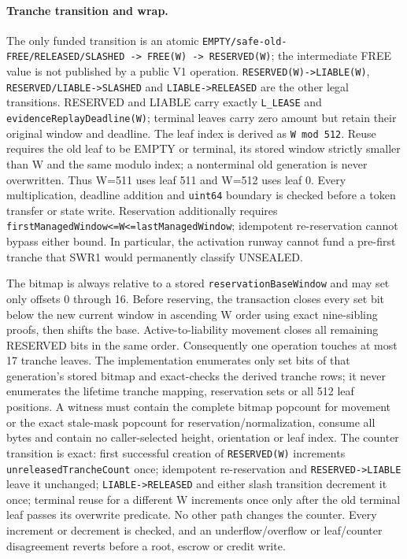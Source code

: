 \documentclass[a4paper,11pt]{article}
\newcommand{\code}[1]{\nolinkurl{#1}}
\begin{document}
\paragraph{Tranche transition and wrap.}
The only funded transition is an atomic
\code{EMPTY/safe-old-FREE/RELEASED/SLASHED -> FREE(W) -> RESERVED(W)};
the intermediate FREE value is not published by a public V1 operation.
\code{RESERVED(W)->LIABLE(W)},
\code{RESERVED/LIABLE->SLASHED} and \code{LIABLE->RELEASED} are the other
legal transitions.  RESERVED and LIABLE carry exactly \code{L_LEASE} and
\code{evidenceReplayDeadline(W)}; terminal leaves carry zero amount but retain
their original window and deadline.  The leaf index is derived as
\code{W mod 512}.  Reuse requires the old leaf to be EMPTY or terminal, its
stored window strictly smaller than W and the same modulo index; a nonterminal
old generation is never overwritten.  Thus W=511 uses leaf 511 and W=512 uses
leaf 0.  Every multiplication, deadline addition and \code{uint64} boundary is
checked before a token transfer or state write.  Reservation additionally
requires \code{firstManagedWindow<=W<=lastManagedWindow}; idempotent
re-reservation cannot bypass either bound.  In particular, the activation
runway cannot fund a pre-first tranche that SWR1 would permanently classify
UNSEALED.

The bitmap is always relative to a stored \code{reservationBaseWindow} and may
set only offsets 0 through 16.  Before reserving, the transaction closes every
set bit below the new current window in ascending W order using exact
nine-sibling proofs, then shifts the base.  Active-to-liability movement closes
all remaining RESERVED bits in the same order.  Consequently one operation
touches at most 17 tranche leaves.  The implementation enumerates only set bits
of that generation's stored bitmap and exact-checks the derived tranche rows;
it never enumerates the lifetime tranche mapping, reservation sets or all 512
leaf positions.  A witness
must contain the complete bitmap popcount for movement or the exact stale-mask
popcount for reservation/normalization, consume all bytes and contain no
caller-selected height, orientation or leaf index.
The counter transition is exact: first successful creation of
\code{RESERVED(W)} increments \code{unreleasedTrancheCount} once; idempotent
re-reservation and \code{RESERVED->LIABLE} leave it unchanged;
\code{LIABLE->RELEASED} and either slash transition decrement it once; terminal
reuse for a different W increments once only after the old terminal leaf passes
its overwrite predicate.  No other path changes the counter.  Every increment
or decrement is checked, and an underflow/overflow or leaf/counter disagreement
reverts before a root, escrow or credit write.
\end{document}
